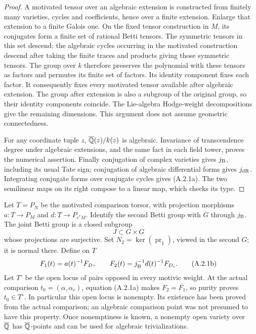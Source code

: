 \begin{proof}
A motivated tensor over an algebraic extension is constructed from
finitely many varieties, cycles and coefficients, hence over a finite
extension. Enlarge that extension to a finite Galois one. On the
fixed tensor construction in $M$, its conjugates form a finite set
of rational Betti tensors. The symmetric tensors in this set descend:
the algebraic cycles occurring in the motivated construction descend
after taking the finite traces and products giving those symmetric
tensors. The group over $k$ therefore preserves the polynomial with
these tensors as factors and permutes its finite set of factors.
Its identity component fixes each factor. It consequently fixes
every motivated tensor available after algebraic extension. The
group after extension is also a subgroup of the original group, so
their identity components coincide. The Lie-algebra Hodge-weight
decompositions give the remaining dimensions. This argument does not
assume geometric connectedness.

For any coordinate tuple $z$, $\overline{\mathbb Q}(z)/k(z)$ is algebraic. Invariance
of transcendence degree under algebraic extensions, and the same
fact in each field tower, proves the numerical assertion. Finally
conjugation of complex varieties gives $j_{\mathrm B}$, including its usual
Tate sign; conjugation of algebraic differential forms gives
$j_{\mathrm{dR}}$. Integrating conjugate forms over conjugate cycles gives
(A.2.1a). The two semilinear maps on its right compose to a linear
map, which checks its type.
\end{proof}

Let $T=P_N$ be the motivated comparison torsor, with projection
morphisms $a:T\to P_M$ and $d:T\to P_{c^*M}$. Identify the second
Betti group with $G$ through $j_{\mathrm B}$. The joint Betti group is a
closed subgroup
\[
                 J\subset G\times G
\]
whose projections are surjective. Set $N_2=\ker(\operatorname{pr}_1)$,
viewed in the second $G$; it is normal there. Define on $T$
\[
 F_1(t)=a(t)^{-1}F_D,\qquad
 F_2(t)=j_{\mathrm B}^{-1}d(t)^{-1}F_{D_c}.
 \tag{A.2.1b}
\]
Let $T^\circ$ be the open locus of pairs opposed in every motivic
weight. At the actual comparison $t_0=(\alpha,\alpha_c)$, equation
(A.2.1a) makes $F_2=\overline{F_1}$, so purity proves
$t_0\in T^\circ$. In particular this open locus is nonempty.
Its existence has been proved from the actual comparison; an
algebraic comparison point was not presumed to have this property.
Once nonemptiness is known, a nonempty open variety over $\overline{\mathbb Q}$ has
$\overline{\mathbb Q}$-points and can be used for algebraic trivializations.

